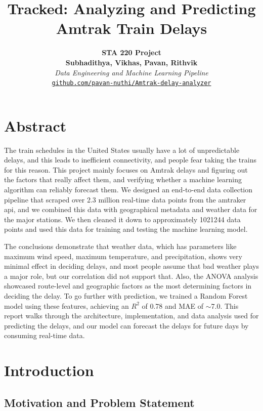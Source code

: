 \documentclass[11pt]{article}
\title{\textbf{Tracked: Analyzing and Predicting Amtrak Train Delays}}
\author{\textbf{STA 220 Project} \\ \textbf{Subhadithya, Vikhas, Pavan, Rithvik} \\ \textit{Data Engineering and Machine Learning Pipeline} \\ \vspace{0.1cm} \href{https://github.com/pavan-nuthi/Amtrak-delay-analyzer}{\texttt{github.com/pavan-nuthi/Amtrak-delay-analyzer}}}
\date{}
\begin{document}
\setcounter{page}{1}
\maketitle

\vspace{1cm}
\section{Abstract}

The train schedules in the United States usually have a lot of unpredictable delays, and this leads to inefficient connectivity, and people fear taking the trains for this reason. This project mainly focuses on Amtrak delays and figuring out the factors that really affect them, and verifying whether a machine learning algorithm can reliably forecast them. We designed an end-to-end data collection pipeline that scraped over 2.3 million real-time data points from the amtraker api, and we combined this data with geographical metadata and weather data for the major stations. We then cleaned it down to approximately 1021244 data points and used this data for training and testing the machine learning model.

The conclusions demonstrate that weather data, which has parameters like maximum wind speed, maximum temperature, and precipitation, shows very minimal effect in deciding delays, and most people assume that bad weather plays a major role, but our correlation did not support that. Also, the ANOVA analysis showcased route-level and geographic factors as the most determining factors in deciding the delay. To go further with prediction, we trained a Random Forest model using these features, achieving an $R^2$ of 0.78 and MAE of $\sim$7.0. This report walks through the architecture, implementation, and data analysis used for predicting the delays, and our model can forecast the delays for future days by consuming real-time data.

\clearpage

\section{Introduction}

\subsection{Motivation and Problem Statement}
\end{document}
